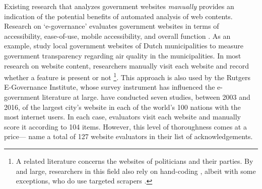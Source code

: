 \documentclass[11pt]{article}
\begin{document}

Existing research that analyzes government websites \textit{manually} provides an indication of the potential benefits of automated analysis of web contents. Research on `e-governance' evaluates government websites in terms of accessibility, ease-of-use, mobile accessibility, and overall function \citep[e.g., ][]{Urban2002,tolbert2008institutions,mcnutt2010virtual,Armstrong2011,Feeney2017,mossey2019harnessing}. As an example, \cite{grimmelikhuijsen2012developing} study local government websites of Dutch municipalities to measure government transparency regarding air quality in the municipalities. In most research on website content, researchers manually visit each website and record whether a feature is present or not \citep{kaylor2001gauging, Urban2002, jeffres2006metropolitan, Armstrong2011, dolson2012explaining, Feeney2017}\footnote{A related literature concerns the websites of politicians and their parties. By and large, researchers in this field also rely on hand-coding \citep{Norris2003,Druckman2009,Druckman2010,Esterling2011}, albeit with some exceptions, who do use targeted scrapers \citep{Therriault2010,cryer2019navigating}.}. This approach is also used by the Rutgers E-Governance Institute, whose survey instrument has influenced the e-government literature at large. \cite{holzer2016digital} have conducted seven studies, between 2003 and 2016, of the largest city's website in each of the world's 100 nations with the most internet users. In each case, evaluators visit each website and manually score it according to 104 items. However, this level of thoroughness comes at a price---\cite{holzer2016digital} name a total of 127 website evaluators in their list of acknowledgements.
\end{document}
